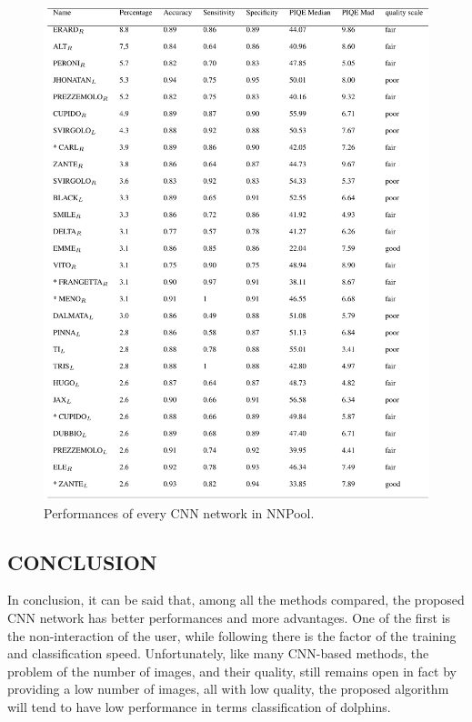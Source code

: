 \begin{figure}[h!]
    \centering
    \includegraphics[width = 0.8\linewidth]{images/paper10/NNPool performance.png}
    \centering
    \caption{Performances of every CNN network in NNPool.}
    \label{fig: CNNNNPool perfromance}
\end{figure}

\subsection{CONCLUSION}
In conclusion, it can be said that, among all the methods compared, the 
proposed CNN network has better performances and more advantages. One 
of the first is the non-interaction of the user, while following there is the factor 
of the training and classification speed. Unfortunately, like many CNN-based 
methods, the problem of the number of images, and their quality, still remains 
open in fact by providing a low number of images, all with low quality, the 
proposed algorithm will tend to have low performance in terms classification 
of dolphins.

